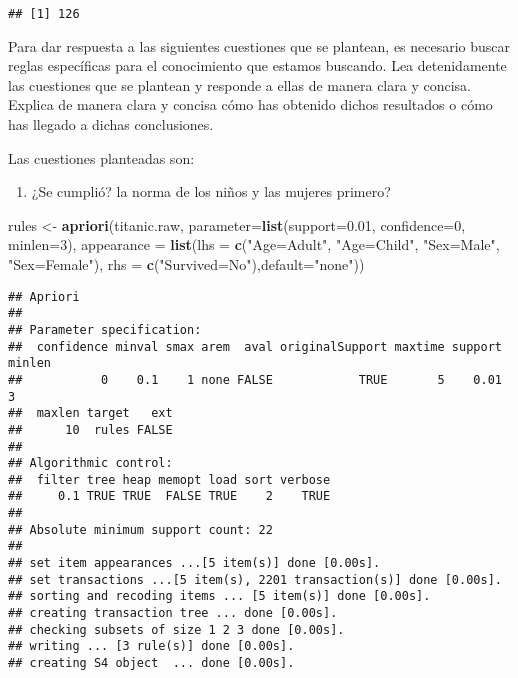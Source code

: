 \documentclass[]{article}
\newenvironment{Shaded}{\begin{snugshade}}{\end{snugshade}}
\newcommand{\DataTypeTok}[1]{\textcolor[rgb]{0.13,0.29,0.53}{#1}}
\newcommand{\DecValTok}[1]{\textcolor[rgb]{0.00,0.00,0.81}{#1}}
\newcommand{\FloatTok}[1]{\textcolor[rgb]{0.00,0.00,0.81}{#1}}
\newcommand{\KeywordTok}[1]{\textcolor[rgb]{0.13,0.29,0.53}{\textbf{#1}}}
\newcommand{\NormalTok}[1]{#1}
\newcommand{\StringTok}[1]{\textcolor[rgb]{0.31,0.60,0.02}{#1}}
\providecommand{\tightlist}{%
  \setlength{\itemsep}{0pt}\setlength{\parskip}{0pt}}
\begin{document}
\begin{verbatim}
## [1] 126
\end{verbatim}

Para dar respuesta a las siguientes cuestiones que se plantean, es
necesario buscar reglas específicas para el conocimiento que estamos
buscando. Lea detenidamente las cuestiones que se plantean y responde a
ellas de manera clara y concisa. Explica de manera clara y concisa cómo
has obtenido dichos resultados o cómo has llegado a dichas conclusiones.

Las cuestiones planteadas son:

\begin{enumerate}
\def\labelenumi{\alph{enumi})}
\tightlist
\item
  ¿Se cumplió? la norma de los niños y las mujeres primero?
\end{enumerate}

\begin{Shaded}
\begin{Highlighting}[]
\NormalTok{rules <-}\StringTok{ }\KeywordTok{apriori}\NormalTok{(titanic.raw, }\DataTypeTok{parameter=}\KeywordTok{list}\NormalTok{(}\DataTypeTok{support=}\FloatTok{0.01}\NormalTok{, }\DataTypeTok{confidence=}\DecValTok{0}\NormalTok{, }\DataTypeTok{minlen=}\DecValTok{3}\NormalTok{), }
                 \DataTypeTok{appearance =} \KeywordTok{list}\NormalTok{(}\DataTypeTok{lhs =} \KeywordTok{c}\NormalTok{(}\StringTok{"Age=Adult"}\NormalTok{, }\StringTok{"Age=Child"}\NormalTok{, }\StringTok{"Sex=Male"}\NormalTok{, }\StringTok{"Sex=Female"}\NormalTok{), }
                                   \DataTypeTok{rhs =} \KeywordTok{c}\NormalTok{(}\StringTok{"Survived=No"}\NormalTok{),}\DataTypeTok{default=}\StringTok{"none"}\NormalTok{))}
\end{Highlighting}
\end{Shaded}

\begin{verbatim}
## Apriori
## 
## Parameter specification:
##  confidence minval smax arem  aval originalSupport maxtime support minlen
##           0    0.1    1 none FALSE            TRUE       5    0.01      3
##  maxlen target   ext
##      10  rules FALSE
## 
## Algorithmic control:
##  filter tree heap memopt load sort verbose
##     0.1 TRUE TRUE  FALSE TRUE    2    TRUE
## 
## Absolute minimum support count: 22 
## 
## set item appearances ...[5 item(s)] done [0.00s].
## set transactions ...[5 item(s), 2201 transaction(s)] done [0.00s].
## sorting and recoding items ... [5 item(s)] done [0.00s].
## creating transaction tree ... done [0.00s].
## checking subsets of size 1 2 3 done [0.00s].
## writing ... [3 rule(s)] done [0.00s].
## creating S4 object  ... done [0.00s].
\end{verbatim}
\end{document}
